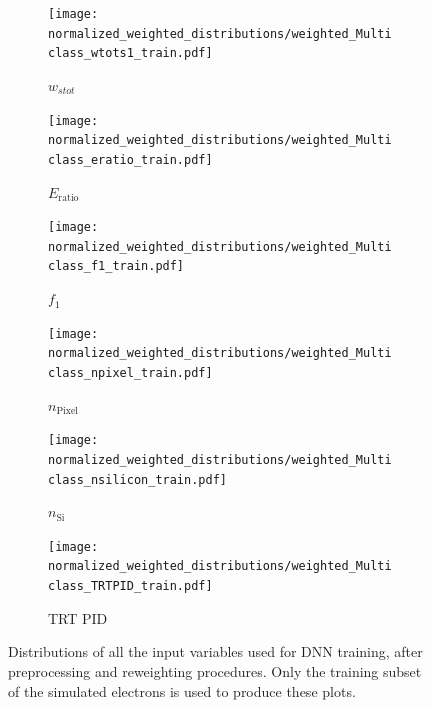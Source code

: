 \begin{figure}[htbp]
  \centering

  \begin{subfigure}[b]{0.49\textwidth}
    \centering
    \texttt{[image: normalized\_weighted\_distributions/weighted\_Multiclass\_wtots1\_train.pdf]}
    \caption{$w_{stot}$}
    \label{fig:input7}
  \end{subfigure}\hfill
  \begin{subfigure}[b]{0.49\textwidth}
    \centering
    \texttt{[image: normalized\_weighted\_distributions/weighted\_Multiclass\_eratio\_train.pdf]}
    \caption{$E_{\text{ratio}}$}
    \label{fig:input8}
  \end{subfigure}

  \vspace{0.45cm}

  \begin{subfigure}[b]{0.49\textwidth}
    \centering
    \texttt{[image: normalized\_weighted\_distributions/weighted\_Multiclass\_f1\_train.pdf]}
    \caption{$f_1$}
    \label{fig:input9}
  \end{subfigure}\hfill
  \begin{subfigure}[b]{0.49\textwidth}
    \centering
    \texttt{[image: normalized\_weighted\_distributions/weighted\_Multiclass\_npixel\_train.pdf]}
    \caption{$n_{\text{Pixel}}$}
    \label{fig:input11}
  \end{subfigure}

  \vspace{0.45cm}

  \begin{subfigure}[b]{0.49\textwidth}
    \centering
    \texttt{[image: normalized\_weighted\_distributions/weighted\_Multiclass\_nsilicon\_train.pdf]}
    \caption{$n_{\text{Si}}$}
    \label{fig:input12}
  \end{subfigure}\hfill
  \begin{subfigure}[b]{0.49\textwidth}
    \centering
    \texttt{[image: normalized\_weighted\_distributions/weighted\_Multiclass\_TRTPID\_train.pdf]}
    \caption{TRT PID}
    \label{fig:input18}
  \end{subfigure}

  \caption{Distributions of all the input variables used for DNN training, after preprocessing and reweighting procedures. Only the training subset of the simulated electrons is used to produce these plots.}
  \label{fig:dnn_inputs_distributions_B}
\end{figure}


